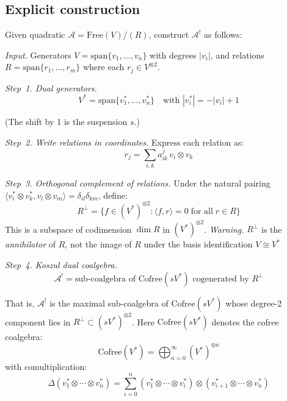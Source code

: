\subsection{Explicit construction}

\begin{construction}\label{const:quadratic-dual-criteria}
Given quadratic $\mathcal{A} = \text{Free}(V) / (R)$, construct $\mathcal{A}^!$ as follows:

\emph{Input.}
Generators $V = \text{span}\{v_1, \ldots, v_n\}$ with degrees $|v_i|$, and relations $R = \text{span}\{r_1, \ldots, r_m\}$ where each $r_j \in V^{\otimes 2}$.

\emph{Step~1. Dual generators.}
\[V^* = \text{span}\{v_1^*, \ldots, v_n^*\} \quad \text{with } |v_i^*| = -|v_i| + 1\]

(The shift by 1 is the suspension $s$.)

\emph{Step~2. Write relations in coordinates.}
Express each relation as:
\[r_j = \sum_{i,k} a_{ik}^j \, v_i \otimes v_k\]

\emph{Step~3. Orthogonal complement of relations.}
Under the natural pairing $\langle v_i^* \otimes v_k^*, v_l \otimes v_m \rangle
= \delta_{il}\delta_{km}$, define:
\[R^\perp = \{f \in (V^*)^{\otimes 2} : \langle f, r \rangle = 0
\;\text{for all}\; r \in R\}\]
This is a subspace of codimension $\dim R$ in $(V^*)^{\otimes 2}$.
\emph{Warning.} $R^\perp$ is the \emph{annihilator} of $R$, not the image of $R$
under the basis identification $V \cong V^*$

\emph{Step~4. Koszul dual coalgebra.}
\[\mathcal{A}^! = \text{sub-coalgebra of } \text{Cofree}(sV^*) \text{ cogenerated by } R^\perp\]

That is, $\mathcal{A}^!$ is the maximal sub-coalgebra of $\text{Cofree}(sV^*)$ whose degree-2 component lies in $R^\perp \subset (sV^*)^{\otimes 2}$.  Here $\text{Cofree}(sV^*)$ denotes the cofree coalgebra:
\[\text{Cofree}(V^*) = \bigoplus_{n=0}^\infty (V^*)^{\otimes n}\]
with comultiplication:
\[\Delta(v_1^* \otimes \cdots \otimes v_n^*) = \sum_{i=0}^n 
(v_1^* \otimes \cdots \otimes v_i^*) \otimes (v_{i+1}^* \otimes \cdots \otimes v_n^*)\]
\end{construction}

